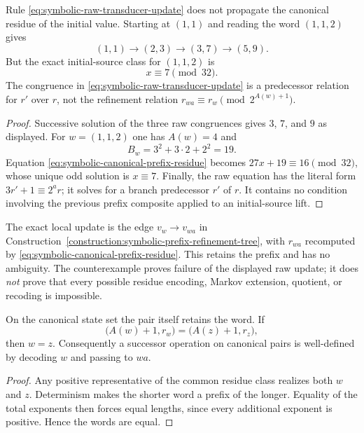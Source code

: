 \begin{proposition}
\label{prop:symbolic-transducer-counterexample}
Rule \eqref{eq:symbolic-raw-transducer-update} does not propagate the
canonical residue of the initial value.  Starting at $(1,1)$ and reading
the word $(1,1,2)$ gives
\[
 (1,1)\longrightarrow(2,3)\longrightarrow(3,7)
 \longrightarrow(5,9).
\]
But the exact initial-source class for $(1,1,2)$ is
\[
 x\equiv7\pmod{32}.
\]
The congruence in \eqref{eq:symbolic-raw-transducer-update} is a predecessor
relation for $r'$ over $r$, not the refinement relation
$r_{wa}\equiv r_w\pmod{2^{A(w)+1}}$.
\end{proposition}

\begin{proof}
Successive solution of the three raw congruences gives $3$, $7$, and $9$
as displayed.  For $w=(1,1,2)$ one has $A(w)=4$ and
\[
 B_w=3^2+3\cdot2+2^2=19.
\]
Equation \eqref{eq:symbolic-canonical-prefix-residue} becomes
$27x+19\equiv16\pmod{32}$, whose unique odd solution is $x\equiv7$.
Finally, the raw equation has the literal form $3r'+1\equiv2^ar$; it solves
for a branch predecessor $r'$ of $r$.  It contains no condition involving
the previous prefix composite applied to an initial-source lift.
\end{proof}

The exact local update is the edge $v_w\to v_{wa}$ in
Construction~\ref{construction:symbolic-prefix-refinement-tree}, with
$r_{wa}$ recomputed by \eqref{eq:symbolic-canonical-prefix-residue}.  This
retains the prefix and has no ambiguity.  The counterexample proves failure
of the displayed raw update; it does \emph{not} prove that every possible
residue encoding, Markov extension, quotient, or recoding is impossible.

\begin{proposition}
\label{prop:symbolic-canonical-pair-injection}
On the canonical state set the pair itself retains the word.  If
\[
 \bigl(A(w)+1,r_w\bigr)=\bigl(A(z)+1,r_z\bigr),
\]
then $w=z$.  Consequently a successor operation on canonical pairs is
well-defined by decoding $w$ and passing to $wa$.
\end{proposition}

\begin{proof}
Any positive representative of the common residue class realizes both $w$
and $z$.  Determinism makes the shorter word a prefix of the longer.
Equality of the total exponents then forces equal lengths, since every
additional exponent is positive.  Hence the words are equal.
\end{proof}

